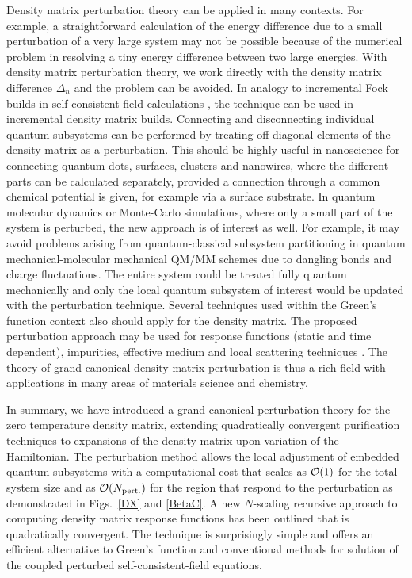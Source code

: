 Density matrix perturbation theory can be applied in many contexts. 
For example, a straightforward calculation of the energy difference 
due to a small perturbation of a very large system may not be possible because
of the numerical problem in resolving a tiny energy difference between
two large energies. With density matrix perturbation theory, 
we work directly with the density matrix difference $\Delta_n$ and the
problem can be avoided. In analogy to incremental Fock builds
in self-consistent field calculations \cite{Schwengler97}, the technique 
can be used in incremental density matrix builds.
Connecting and disconnecting individual
quantum subsystems can be performed by treating off-diagonal elements of the
density matrix as a perturbation. This should be highly useful in nanoscience 
for connecting quantum dots, surfaces, clusters and nanowires, where the different 
parts can be calculated separately, provided a connection through a common
chemical potential is given, for example via a surface substrate.
In quantum molecular dynamics or Monte-Carlo simulations, where only 
a small part of the system is perturbed, the new approach
is of interest as well. For example, it may avoid problems 
arising from quantum-classical subsystem partitioning in 
quantum mechanical-molecular mechanical QM/MM schemes
due to dangling bonds and charge fluctuations. The entire system 
could be treated fully quantum mechanically and only the local 
quantum subsystem of interest would be updated with the perturbation technique. 
Several techniques used within the Green's function context also should 
apply for the density matrix. The proposed perturbation approach may 
be used for response functions (static and time dependent), impurities, 
effective medium and local scattering techniques \cite{Inglesfield81,Turek,Igor}.  
The theory of grand canonical density matrix perturbation is thus a rich field 
with applications in many areas of materials science and chemistry.

In summary, we have introduced a grand canonical perturbation theory 
for the zero temperature density matrix, extending quadratically convergent 
purification techniques to expansions of the density matrix upon variation
of the Hamiltonian.
The perturbation method allows the local adjustment of 
embedded quantum subsystems with a computational cost that scales as ${\cal O}(1)$
for the total system size and as ${\cal O}(N_{\rm pert.})$ for the 
region that respond to the perturbation as demonstrated in Figs.~\ref{DX} 
and \ref{BetaC}. A new $N$-scaling recursive approach to computing density matrix 
response functions has been outlined that is quadratically convergent.
The technique is surprisingly simple and offers an efficient
alternative to Green's function and conventional methods for solution of 
the coupled perturbed self-consistent-field equations.

